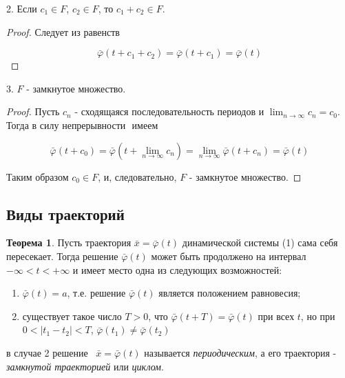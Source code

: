 \documentclass{article}
\theoremstyle{definition} \newtheorem*{theorem*}{Теорема}
\theoremstyle{plain} \newtheorem{theorem}{Теорема}[section]
\theoremstyle{definition} \newtheorem*{corollary*}{Следствие}
\theoremstyle{definition} \newtheorem{corollary}{Следствие}[section]
\begin{document}
2. Если $c_1 \in F$, $c_2 \in F$, то $c_1 + c_2 \in F$.

\begin{proof}
Следует из равенств

\begin{equation*}
    \bar{\varphi}(t + c_1 + c_2)
    = \bar{\varphi}(t + c_1)
    = \bar{\varphi}(t)
\end{equation*}

\end{proof}

3. $F$ - замкнутое множество.
\begin{proof}
Пусть $c_n$ - сходящаяся последовательность периодов
и $\lim_{n \rightarrow \infty} c_n = c_0$. Тогда в силу
непрерывности $ $ имеем

\begin{equation*}
    \bar{\varphi}(t + c_0)
    = \bar{\varphi}(t + \lim_{n \rightarrow \infty} c_n)
    = \lim_{n \rightarrow \infty} \bar{\varphi}(t + c_n)
    = \bar{\varphi}(t)
\end{equation*}

Таким образом $c_0 \in F$, и, следовательно,
$F$ - замкнутое множество.
\end{proof}

\subsection*{Виды траекторий}

\begin{theorem*}
    Пусть траектория $\bar{x} = \bar{\varphi} (t)$ динамической системы
    (1) сама себя пересекает.
    Тогда решение $\bar{\varphi} (t)$ может быть продолжено на интервал
    $- \infty < t < +\infty$ и имеет место одна
    из следующих возможностей:
    \begin{enumerate}
        \item $\bar{\varphi} (t) = a$, т.е. решение $\bar{\varphi} (t)$
            является положением равновесия;
        \item существует такое число $T > 0$, что
            $\bar{\varphi} (t + T) = \bar{\varphi} (t)$
            при всех $t$, но при $0 < \vert t_1 - t_2 \vert < T$,
            $\bar{\varphi} (t_1) \neq \bar{\varphi}(t_2)$
    \end{enumerate}
    в случае 2 решение \ $\bar{x} = \bar{\varphi}(t)$ называется
    \textit{периодическим}, а его траектория
    - \textit{замкнутой траекторией} или \textit{циклом}.
\end{theorem*}
\end{document}
